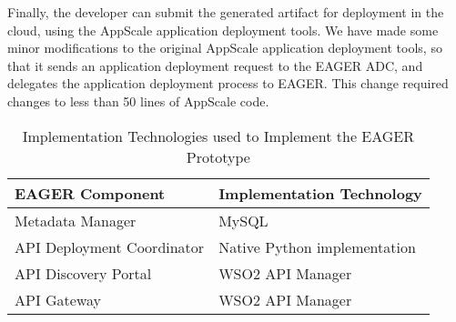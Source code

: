 Finally, the developer can submit the generated artifact for deployment in the
cloud, using the AppScale application deployment tools. We have made some
minor modifications to the original AppScale application deployment tools, so
that it sends an application deployment request to the EAGER ADC, and
delegates the application deployment process to EAGER. This change required
changes to less than 50 lines of AppScale code.


\begin{table}[ht]
\begin{center}
\begin{tabular}{| p{4cm} | p{4cm} |}
\hline
EAGER Component & Implementation Technology\\ \hline
Metadata Manager & MySQL~\cite{mysql}\\
API Deployment Coordinator & Native Python implementation\\
API Discovery Portal & WSO2 API Manager~\cite{wso2am}\\
API Gateway & WSO2 API Manager\\
\hline
\end{tabular}
\end{center}
\caption{Implementation Technologies used to Implement the EAGER Prototype}
\label{tab:imp-tech}
\end{table}
\vspace{-0.2in}

%

